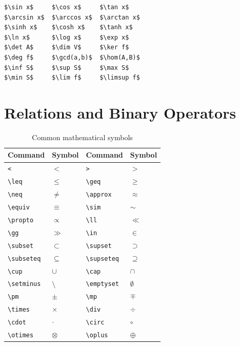 \begin{lstlisting}[language={[LaTeX]TeX}, caption=Math operators]
$\sin x$     $\cos x$     $\tan x$
$\arcsin x$  $\arccos x$  $\arctan x$
$\sinh x$    $\cosh x$    $\tanh x$
$\ln x$      $\log x$     $\exp x$
$\det A$     $\dim V$     $\ker f$
$\deg f$     $\gcd(a,b)$  $\hom(A,B)$
$\inf S$     $\sup S$     $\max S$
$\min S$     $\lim f$     $\limsup f$
\end{lstlisting}

\section{Relations and Binary Operators}

\begin{table}[H]
\centering
\begin{tabular}{llll}
\toprule
\textbf{Command} & \textbf{Symbol} & \textbf{Command} & \textbf{Symbol} \\
\midrule
\verb|<|      & $<$      & \verb|>|       & $>$ \\
\verb|\leq|   & $\leq$   & \verb|\geq|    & $\geq$ \\
\verb|\neq|   & $\neq$   & \verb|\approx| & $\approx$ \\
\verb|\equiv| & $\equiv$ & \verb|\sim|    & $\sim$ \\
\verb|\propto|& $\propto$& \verb|\ll|     & $\ll$ \\
\verb|\gg|    & $\gg$    & \verb|\in|     & $\in$ \\
\verb|\subset|& $\subset$& \verb|\supset| & $\supset$ \\
\verb|\subseteq| & $\subseteq$ & \verb|\supseteq| & $\supseteq$ \\
\verb|\cup|   & $\cup$   & \verb|\cap|    & $\cap$ \\
\verb|\setminus| & $\setminus$ & \verb|\emptyset| & $\emptyset$ \\
\verb|\pm|    & $\pm$    & \verb|\mp|     & $\mp$ \\
\verb|\times| & $\times$ & \verb|\div|    & $\div$ \\
\verb|\cdot|  & $\cdot$  & \verb|\circ|   & $\circ$ \\
\verb|\otimes|& $\otimes$& \verb|\oplus|  & $\oplus$ \\
\bottomrule
\end{tabular}
\caption{Common mathematical symbols}
\end{table}

